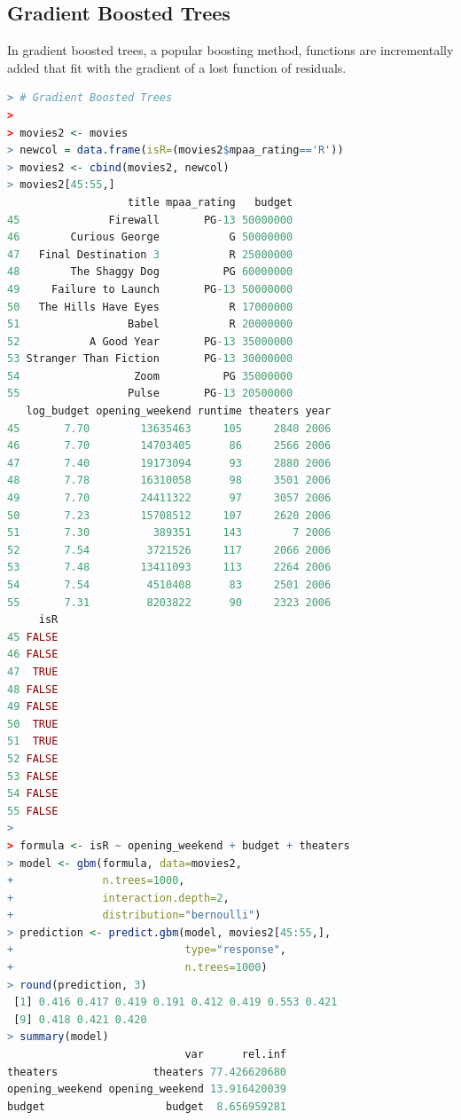 \documentclass{article}
\begin{document}
\begin{spacing}{1.1}
\subsection{Gradient Boosted Trees}

In gradient boosted trees, a popular boosting method, functions are incrementally added that fit with the gradient of a lost function of residuals.  

\vspace{3mm}

\begin{lstlisting}[language=R]
> # Gradient Boosted Trees
> 
> movies2 <- movies
> newcol = data.frame(isR=(movies2$mpaa_rating=='R'))
> movies2 <- cbind(movies2, newcol)
> movies2[45:55,]
                   title mpaa_rating   budget
45              Firewall       PG-13 50000000
46        Curious George           G 50000000
47   Final Destination 3           R 25000000
48        The Shaggy Dog          PG 60000000
49     Failure to Launch       PG-13 50000000
50   The Hills Have Eyes           R 17000000
51                 Babel           R 20000000
52           A Good Year       PG-13 35000000
53 Stranger Than Fiction       PG-13 30000000
54                  Zoom          PG 35000000
55                 Pulse       PG-13 20500000
   log_budget opening_weekend runtime theaters year
45       7.70        13635463     105     2840 2006
46       7.70        14703405      86     2566 2006
47       7.40        19173094      93     2880 2006
48       7.78        16310058      98     3501 2006
49       7.70        24411322      97     3057 2006
50       7.23        15708512     107     2620 2006
51       7.30          389351     143        7 2006
52       7.54         3721526     117     2066 2006
53       7.48        13411093     113     2264 2006
54       7.54         4510408      83     2501 2006
55       7.31         8203822      90     2323 2006
     isR
45 FALSE
46 FALSE
47  TRUE
48 FALSE
49 FALSE
50  TRUE
51  TRUE
52 FALSE
53 FALSE
54 FALSE
55 FALSE
> 
> formula <- isR ~ opening_weekend + budget + theaters
> model <- gbm(formula, data=movies2,
+              n.trees=1000,
+              interaction.depth=2,
+              distribution="bernoulli")
> prediction <- predict.gbm(model, movies2[45:55,],
+                           type="response",
+                           n.trees=1000)
> round(prediction, 3)
 [1] 0.416 0.417 0.419 0.191 0.412 0.419 0.553 0.421
 [9] 0.418 0.421 0.420
> summary(model)
                            var      rel.inf
theaters               theaters 77.426620680
opening_weekend opening_weekend 13.916420039
budget                   budget  8.656959281
\end{lstlisting}


\end{spacing}
\end{document}

